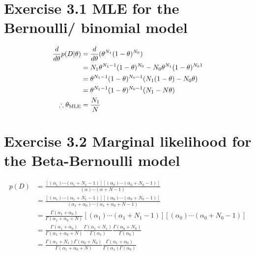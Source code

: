 \documentclass{jsarticle}
\begin{document}
\section*{Exercise 3.1 MLE for the Bernoulli/ binomial model}
\begin{align}
\frac{d}{d\theta}p(D|\theta) & = \frac{d}{d\theta}(\theta^{N_1}(1-\theta)^{N_0})\\
& = N_1 \theta^{N_1-1}(1-\theta)^{N_0}-N_0\theta^{N_1}(1-\theta)^{N_01}\\
& = \theta^{N_1-1}(1-\theta)^{N_0-1}(N_1(1-\theta)-N_0\theta) \\
& = \theta^{N_1-1}(1-\theta)^{N_0-1}(N_1-N\theta)\\
\therefore \theta_{\rm MLE} & =\frac{N_1}{N}
\end{align}

\section*{Exercise 3.2 Marginal likelihood for the Beta-Bernoulli model}
\begin{align}
p(D) & = \frac{[(\alpha_1)\cdots(\alpha_1+N_1-1)][(\alpha_0)\cdots(\alpha_0+N_0-1)]}{(\alpha)\cdots(\alpha + N - 1)}\\
& = \frac{[(\alpha_1)\cdots(\alpha_1+N_1-1)][(\alpha_0)\cdots(\alpha_0+N_0-1)]}{(\alpha_1+\alpha_0)\cdots(\alpha_1 + \alpha_0 + N - 1)}\\
& = \frac{\Gamma(\alpha_1+\alpha_0)}{\Gamma(\alpha_1+\alpha_0+N)}[(\alpha_1)\cdots (\alpha_1+N_1-1)][(\alpha_0)\cdots(\alpha_0+N_0-1)]\\
& = \frac{\Gamma(\alpha_1+\alpha_0)}{\Gamma(\alpha_1+\alpha_0+N)}\frac{\Gamma(\alpha_1+N_1)}{\Gamma(\alpha_1)}\frac{\Gamma(\alpha_0+N_0)}{\Gamma(\alpha_0)}\\
& = \frac{\Gamma(\alpha_1+N_1)\Gamma(\alpha_0+N_0)}{\Gamma(\alpha_1+\alpha_0+N)}\frac{\Gamma(\alpha_1+\alpha_0)}{\Gamma(\alpha_1)\Gamma(\alpha_0)}
\end{align}
\end{document}
